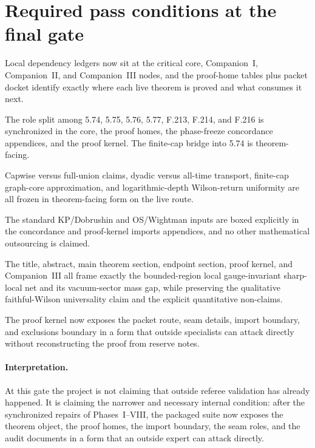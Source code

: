 \section{Required pass conditions at the final gate}\label{sec:p9-pass}

\begin{description}[leftmargin=2.9cm,style=nextline]
\item[Theorem-local closure (\checkmark)] Local dependency ledgers now sit at the critical core, Companion~I, Companion~II, and Companion~III nodes, and the proof-home tables plus packet docket identify exactly where each live theorem is proved and what consumes it next.

\item[No seam ambiguity (\checkmark)] The role split among 5.74, 5.75, 5.76, 5.77, F.213, F.214, and F.216 is synchronized in the core, the proof homes, the phase-freeze concordance appendices, and the proof kernel. The finite-cap bridge into 5.74 is theorem-facing.

\item[Quantifier discipline (\checkmark)] Capwise versus full-union claims, dyadic versus all-time transport, finite-cap graph-core approximation, and logarithmic-depth Wilson-return uniformity are all frozen in theorem-facing form on the live route.

\item[Imported background bounded (\checkmark)] The standard KP/Dobrushin and OS/Wightman inputs are boxed explicitly in the concordance and proof-kernel imports appendices, and no other mathematical outsourcing is claimed.

\item[Claim hygiene (\checkmark)] The title, abstract, main theorem section, endpoint section, proof kernel, and Companion~III all frame exactly the bounded-region local gauge-invariant sharp-local net and its vacuum-sector mass gap, while preserving the qualitative faithful-Wilson universality claim and the explicit quantitative non-claims.

\item[Independent auditability (\checkmark)] The proof kernel now exposes the packet route, seam details, import boundary, and exclusions boundary in a form that outside specialists can attack directly without reconstructing the proof from reserve notes.
\end{description}

\paragraph{Interpretation.}
At this gate the project is not claiming that outside referee validation has already happened. It is claiming the narrower and necessary internal condition: after the synchronized repairs of Phases~I--VIII, the packaged suite now exposes the theorem object, the proof homes, the import boundary, the seam roles, and the audit documents in a form that an outside expert can attack directly.
